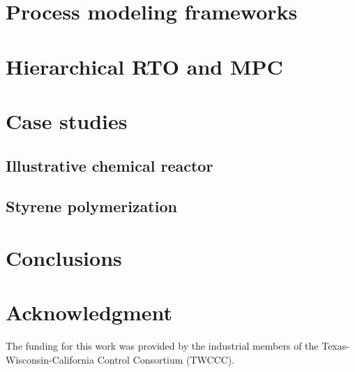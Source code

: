 \documentclass[preprint,5p, twocolumn, authoryear]{elsarticle}
\begin{document}
\section{Process modeling frameworks} 
\label{sec:process_models}

\section{Hierarchical RTO and MPC} 
\label{sec:rto_mpc}

\section{Case studies} \label{sec:case_study}

\subsection{Illustrative chemical reactor}

\subsection{Styrene polymerization}

\section{Conclusions} \label{sec:conclusions}


\section*{Acknowledgment}
The funding for this work was provided by the industrial members of the
Texas-Wisconsin-California Control Consortium (TWCCC). 



\end{document}

